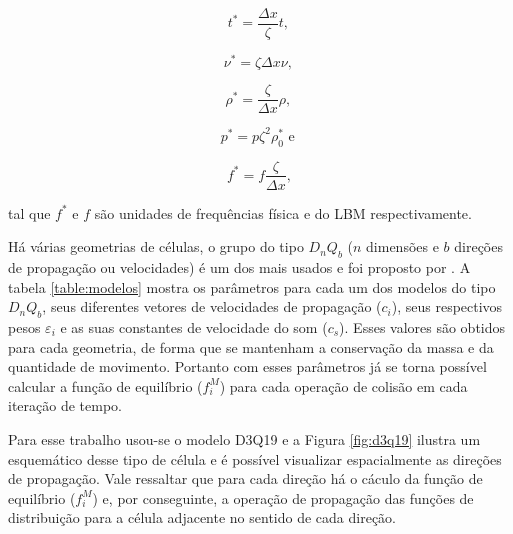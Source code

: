 \begin{equation}
  t^{*} = \frac{\Delta x}{\zeta}t \text{, }
  \label{eq:conversao_4}
\end{equation}

\begin{equation}
  \nu^{*} = \zeta \Delta x \nu\text{, }
  \label{eq:conversao_5}
\end{equation}

\begin{equation}
  \rho^{*} = \frac{\zeta}{\Delta x} \rho \text{, }
  \label{eq:conversao_6}
\end{equation}

\begin{equation}
  p^{*} = p \zeta^{2}  \rho^{*}_{0} \text{ e }
  \label{eq:conversao_7}
\end{equation}

\begin{equation}
  f^{*} = f\frac{\zeta}{\Delta x},
  \label{eq:conversao_8}
\end{equation}

tal que $f^{*}$ e $f$ são unidades de frequências física e do LBM respectivamente.

Há várias geometrias de células, o grupo do tipo $D_{n}Q_{b}$ ($n$ dimensões e $b$ direções de propagação ou velocidades) é um dos mais usados e foi proposto por . A tabela \ref{table:modelos} mostra os parâmetros para cada um dos modelos do tipo $D_{n}Q_{b}$, seus diferentes vetores de velocidades de propagação ($c_{i}$), seus respectivos pesos $\varepsilon_{i}$ e as suas constantes de velocidade do som ($c_{s}$). Esses valores são obtidos para cada geometria, de forma que se mantenham a conservação da massa e da quantidade de movimento. Portanto com esses parâmetros já se torna possível calcular a função de equilíbrio ($f_{i}^{M}$) para cada operação de colisão em cada iteração de tempo.

Para esse trabalho usou-se o modelo D3Q19 e a Figura \ref{fig:d3q19} ilustra um esquemático desse tipo de célula e é possível visualizar espacialmente as direções de propagação. Vale ressaltar que para cada direção há o cáculo da função de equilíbrio ($f_{i}^{M}$) e, por conseguinte, a operação de propagação das funções de distribuição para a célula adjacente no sentido de cada direção.

